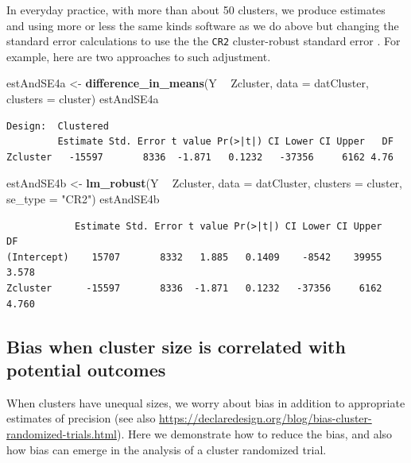 \documentclass[
  12pt,
]{book}
\newenvironment{Shaded}{\begin{snugshade}}{\end{snugshade}}
\newcommand{\DataTypeTok}[1]{\textcolor[rgb]{0.13,0.29,0.53}{#1}}
\newcommand{\KeywordTok}[1]{\textcolor[rgb]{0.13,0.29,0.53}{\textbf{#1}}}
\newcommand{\NormalTok}[1]{#1}
\newcommand{\OperatorTok}[1]{\textcolor[rgb]{0.81,0.36,0.00}{\textbf{#1}}}
\newcommand{\StringTok}[1]{\textcolor[rgb]{0.31,0.60,0.02}{#1}}
\theoremstyle{definition}
\theoremstyle{definition}
\theoremstyle{definition}
\theoremstyle{remark}
\begin{document}
In everyday practice, with more than about 50 clusters, we produce
estimates and using more or less the same kinds software as we do above
but changing the standard error calculations to use the the \texttt{CR2}
cluster-robust standard error \citep{pustejovsky2019cr}. For example,
here are two approaches to such adjustment.

\begin{Shaded}
\begin{Highlighting}[]
\NormalTok{estAndSE4a <-}\StringTok{ }\KeywordTok{difference_in_means}\NormalTok{(Y }\OperatorTok{~}\StringTok{ }\NormalTok{Zcluster, }\DataTypeTok{data =}\NormalTok{ datCluster, }\DataTypeTok{clusters =}\NormalTok{ cluster)}
\NormalTok{estAndSE4a}
\end{Highlighting}
\end{Shaded}

\begin{verbatim}
Design:  Clustered 
         Estimate Std. Error t value Pr(>|t|) CI Lower CI Upper   DF
Zcluster   -15597       8336  -1.871   0.1232   -37356     6162 4.76
\end{verbatim}

\begin{Shaded}
\begin{Highlighting}[]
\NormalTok{estAndSE4b <-}\StringTok{ }\KeywordTok{lm_robust}\NormalTok{(Y }\OperatorTok{~}\StringTok{ }\NormalTok{Zcluster, }\DataTypeTok{data =}\NormalTok{ datCluster, }\DataTypeTok{clusters =}\NormalTok{ cluster, }\DataTypeTok{se_type =} \StringTok{"CR2"}\NormalTok{)}
\NormalTok{estAndSE4b}
\end{Highlighting}
\end{Shaded}

\begin{verbatim}
            Estimate Std. Error t value Pr(>|t|) CI Lower CI Upper    DF
(Intercept)    15707       8332   1.885   0.1409    -8542    39955 3.578
Zcluster      -15597       8336  -1.871   0.1232   -37356     6162 4.760
\end{verbatim}

\hypertarget{bias-when-cluster-size-is-correlated-with-potential-outcomes}{%
\subsection{Bias when cluster size is correlated with potential
outcomes}\label{bias-when-cluster-size-is-correlated-with-potential-outcomes}}

When clusters have unequal sizes, we worry about bias in addition to
appropriate estimates of precision \citep{middleton2015unbiased} (see
also
\url{https://declaredesign.org/blog/bias-cluster-randomized-trials.html}).
Here we demonstrate how to reduce the bias, and also how bias can emerge
in the analysis of a cluster randomized trial.
\end{document}
